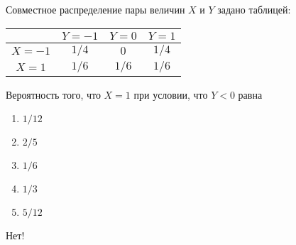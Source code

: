 \documentclass[t]{beamer}
\begin{document}
 \begin{frame} \label{14-No} 
\begin{block}{14} 

Совместное распределение пары величин $X$ и $Y$ задано таблицей:
\begin{center}
\begin{tabular}{@{}c|ccc@{}}
\toprule
       & $Y=-1$ & $Y=0$ & $Y=1$ \\ \midrule
$X=-1$ & $1/4$  & $0$   & $1/4$ \\
$X=1$  & $1/6$  & $1/6$ & $1/6$ \\ \bottomrule
\end{tabular}
\end{center}

\vspace{0.5cm} 
 
 
Вероятность того, что $X=1$ при условии, что $Y<0$ равна
 


 \end{block} 
\begin{enumerate} 
\item[] \hyperlink{14-No}{\beamergotobutton{} $1/12$}
\item[] \hyperlink{14-Yes}{\beamergotobutton{} $2/5$}
\item[] \hyperlink{14-No}{\beamergotobutton{} $1/6$}
\item[] \hyperlink{14-No}{\beamergotobutton{} $1/3$
}
\item[] \hyperlink{14-No}{\beamergotobutton{} $5/12$}
\end{enumerate} 

 \alert{Нет!} 
\end{frame} 
\end{document}

